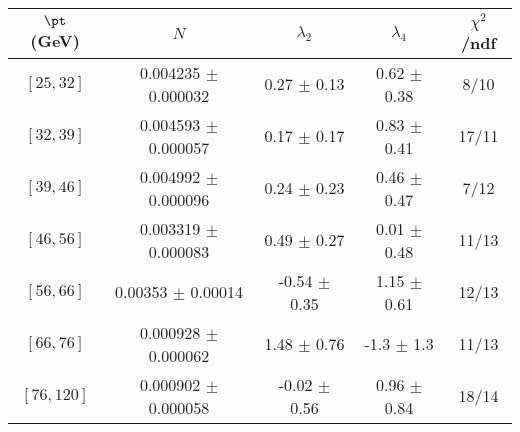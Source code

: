 \begin{tabular}{c||c|c|c|c}
$\pt$ (GeV) & $N$ & $\lambda_{2}$ & $\lambda_4$  & $\chi^2$/ndf  \\
\hline
$[25, 32]$ & 0.004235 $\pm$ 0.000032 & 0.27 $\pm$ 0.13 & 0.62 $\pm$ 0.38 & 8/10\\
$[32, 39]$ & 0.004593 $\pm$ 0.000057 & 0.17 $\pm$ 0.17 & 0.83 $\pm$ 0.41 & 17/11\\
$[39, 46]$ & 0.004992 $\pm$ 0.000096 & 0.24 $\pm$ 0.23 & 0.46 $\pm$ 0.47 & 7/12\\
$[46, 56]$ & 0.003319 $\pm$ 0.000083 & 0.49 $\pm$ 0.27 & 0.01 $\pm$ 0.48 & 11/13\\
$[56, 66]$ & 0.00353 $\pm$ 0.00014 & -0.54 $\pm$ 0.35 & 1.15 $\pm$ 0.61 & 12/13\\
$[66, 76]$ & 0.000928 $\pm$ 0.000062 & 1.48 $\pm$ 0.76 & -1.3 $\pm$ 1.3 & 11/13\\
$[76, 120]$ & 0.000902 $\pm$ 0.000058 & -0.02 $\pm$ 0.56 & 0.96 $\pm$ 0.84 & 18/14\\
\end{tabular}
